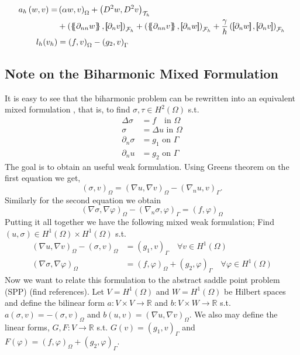 \begin{equation*}
\begin{split}
a_{h} \left( w, v \right)   =&
    \left( \alpha  w, v \right) _{\Omega }   +  \left( D^2 w, D^2v \right) _{\mathcal{T} _{h}} \\
 & +
  \left( \mean{  \partial _{n n} w }, \jump{ \partial _{n }v} \right)_{\mathcal{F}_{h}}  +
 \left( \mean{ \partial _{n n} v }, \jump{ \partial _{n}w }      \right)_{\mathcal{F}_{h}}  + \frac{\gamma }{h}  \left( \jump{ \partial _{n} w}, \jump{ \partial _{n} v   }   \right)_{\mathcal{F}_{h}} \\
 l_{h}( v_{h}) & =  \left( f, v \right) _{\Omega }  - \left(g_{2}, v  \right) _{\Gamma }
\end{split}
\end{equation*}


\subsection{Note on the Biharmonic Mixed Formulation}%
\label{subsec:biharmonic_mixed_formulation}

It is easy to see that the biharmonic problem can be rewritten into an equivalent mixed formulation , that is, to find $\sigma, \tau  \in H^2( \Omega ) $ s.t. \[
    \begin{split}
\Delta \sigma  & = f \quad  \text{in } \Omega \\
\sigma   & = \Delta u  \text{ in } \Omega \\
\partial _{n} \sigma  & = g_{1} \text{ on } \Gamma  \\
\partial _{n} u   & = g_{2} \text{ on } \Gamma
    \end{split}
\]
The goal is to obtain an useful weak formulation. Using Greens theorem on the first equation we get,
\[
( \sigma, v)_{\Omega } = ( \nabla  u , \nabla v  )_{\Omega } - ( \nabla _{n} u , v) _{\Gamma }.
\]
Similarly for the second equation we obtain
\[
( \nabla \sigma , \nabla \varphi  )_{\Omega} - ( \nabla _{n} \sigma ,  \varphi )_{\Gamma } = ( f,\varphi ) _{\Omega}
\]
Putting it all together we have the following mixed weak formulation; Find $( u, \sigma ) \in H^{1}( \Omega ) \times H^{1}( \Omega )  $ s.t. \[
    \begin{split}
     ( \nabla  u , \nabla v  )_{\Omega } -( \sigma, v)_{\Omega }  & =   ( g_{1} , v) _{\Gamma } \quad  \forall v \in H^{1}( \Omega ) \\
( \nabla \sigma , \nabla \varphi  )_{\Omega}  & = ( f,\varphi ) _{\Omega} + ( g_{2} ,  \varphi )_{\Gamma } \quad  \forall \varphi \in H^{1}( \Omega )
    \end{split}
\]
Now we want to relate this formulation to the abstract saddle point problem (SPP) (find references).
Let $V = H^{1}( \Omega ) $  and $W=H^{1}( \Omega ) $ be  Hilbert spaces and define the bilinear form $a: V\times V \to \mathbb{R}  $ and $b: V \times W \to \mathbb{R} $ s.t. $a( \sigma,v ) = - ( \sigma , v) _{\Omega }  $ and $b( u,v) = ( \nabla u,
\nabla v)_{\Omega  }  $. We also may define the linear forms, $G,F: V \to \mathbb{R} $ s.t. $ G( v)  = ( g_{1}, v) _{\Gamma } $ and $F( \varphi ) = ( f, \varphi )_{\Omega } + ( g_{2}, \varphi )_{\Gamma } $.

